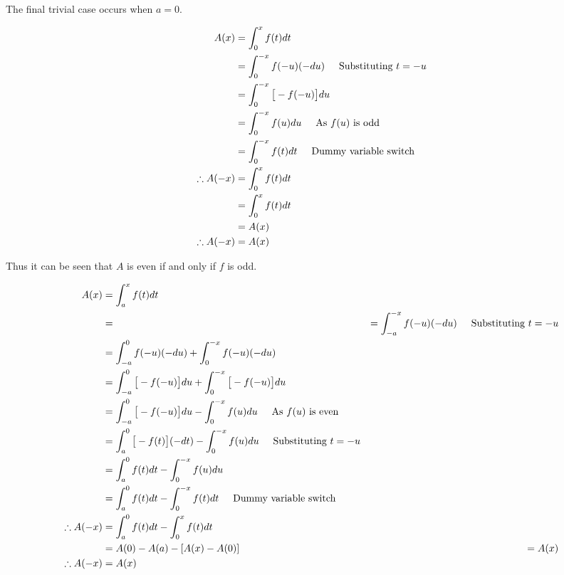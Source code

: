 		The final trivial case occurs when $\displaystyle{a=0}$.

		\begin{align*}
		A(x) & = \int_{0}^{x}f(t)dt\\
		& = \int_{0}^{-x}f(-u)(-du) \hspace{5mm} \text{Substituting $t = -u$}\\
		& = \int_{0}^{-x}\big[-f(-u)\big]du\\
		& = \int_{0}^{-x}f(u)du \hspace{5mm} \text{As $\displaystyle{f(u)}$ is odd}\\
		& = \int_{0}^{-x}f(t)dt \hspace{5mm} \text{Dummy variable switch}\\
		\therefore A(-x) & = \int_{0}^{x}f(t)dt\\
		& = \int_{0}^{x}f(t)dt\\
		& = A(x)\\
		\therefore A(-x) & = A(x)\\
		\end{align*}

		Thus it can be seen that $A$ is even if and only if $f$ is odd. 


		\begin{align*}
		A(x) & = \int_{a}^{x}f(t)dt\\
		& = & = \int_{-a}^{-x}f(-u)(-du) \hspace{5mm} \text{Substituting $t = -u$}\\
		& = \int_{-a}^{0}f(-u)(-du) + \int_{0}^{-x}f(-u)(-du)\\
		& = \int_{-a}^{0}\big[-f(-u)\big]du + \int_{0}^{-x}\big[-f(-u)\big]du\\
		& = \int_{-a}^{0}\big[-f(-u)\big]du - \int_{0}^{-x}f(u)du \hspace{5mm} \text{As $\displaystyle{f(u)}$ is even}\\
		& = \int_{a}^{0}\big[-f(t)\big](-dt) - \int_{0}^{-x}f(u)du \hspace{5mm} \text{Substituting $t = -u$}\\
		& = \int_{a}^{0}f(t)dt - \int_{0}^{-x}f(u)du\\
		& = \int_{a}^{0}f(t)dt - \int_{0}^{-x}f(t)dt \hspace{5mm} \text{Dummy variable switch}\\
		\therefore A(-x) & = \int_{a}^{0}f(t)dt - \int_{0}^{x}f(t)dt\\
		& = A(0) - A(a) - [A(x) - A(0)]
		& = A(x)\\
		\therefore A(-x) & = A(x)\\
		\end{align*}

